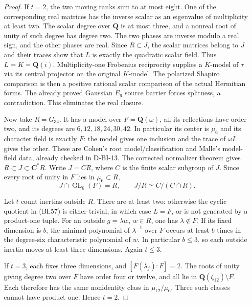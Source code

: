 \begin{proof}
If $t=2$, the two moving ranks sum to at most eight.  One of
the corresponding real matrices has the inverse scalar as an
eigenvalue of multiplicity at least two.  The scalar degree over
$\mathbf Q$ is at most three, and a nonreal root of unity of
such degree has degree two.  The two phases are inverse modulo
a real sign, and the other phases are real.  Since $R\subset J$,
the scalar matrices belong to $J$ and their traces show that
$L$ is exactly the quadratic scalar field.  Thus $L=K=\mathbf Q(i)$.
Multiplicity-one Frobenius reciprocity supplies a $K$-model of
$\tau$ via its central projector on the original $K$-model.
The polarized Shapiro comparison is then a positive rational
scalar comparison of the actual Hermitian forms.  The already
proved Gaussian $E_6$ source barrier forces splitness, a
contradiction.  This eliminates the real closure.

Now take $R=G_{34}$.  It has a model over $F=\mathbf Q(\omega)$,
all its reflections have order two, and its degrees are
$6,12,18,24,30,42$.  In particular its center is $\mu_6$ and
its character field is exactly $F$: the model gives one inclusion
and the trace of $\omega I$ gives the other.  These are Cohen's
root model/classification and Malle's model-field data, already
checked in D-BI-13.  The corrected normalizer theorem gives
$R\subset J\subset\mathbf C^*R$.  Write $J=CR$, where $C$
is the finite scalar subgroup of $J$.  Since every root of unity
in $F$ lies in $\mu_6\subset R$,
\[
             J\cap\operatorname{GL}_6(F)=R,
             \qquad J/R\simeq C/(C\cap R).                 \tag{BI.57}
\]

Let $t$ count inertias outside $R$.  There are at least two:
otherwise the cyclic quotient in (BI.57) is either trivial,
in which case $L=F$, or is not generated by a product-one tuple.
For an outside $g=\lambda w$, $w\in R$, one has
$\lambda\notin F$.  If its fixed dimension is $b$, the
minimal polynomial of $\lambda^{-1}$ over $F$ occurs at least
$b$ times in the degree-six characteristic polynomial of $w$.
In particular $b\le3$, so each outside inertia moves at least
three dimensions.  Again $t\le3$.

If $t=3$, each fixes three dimensions, and
$[F(\lambda_j):F]=2$.  The roots of unity giving degree two
over $F$ have order four or twelve, and all lie in
$\mathbf Q(\zeta_{12})\setminus F$.  Each therefore has the
same nonidentity class in $\mu_{12}/\mu_6$.  Three such
classes cannot have product one.  Hence $t=2$.


\end{proof}
